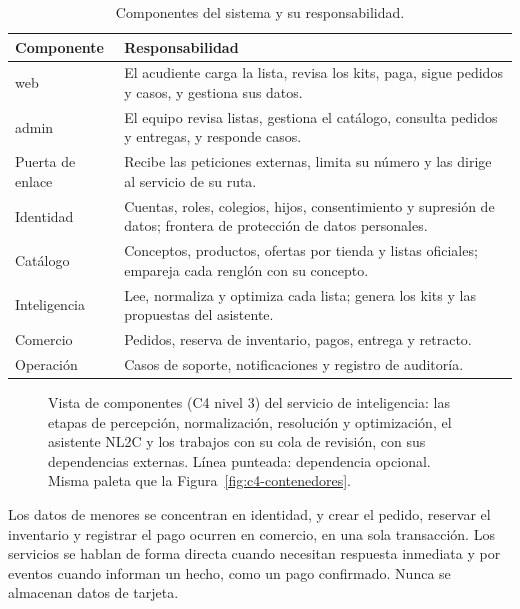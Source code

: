 \begin{table}[!htb]
\centering\footnotesize
\setlength{\tabcolsep}{4pt}
\renewcommand{\arraystretch}{1.15}
\caption{Componentes del sistema y su responsabilidad.}
\label{tab:servicios}
\begin{tabularx}{\textwidth}{@{}p{2.9cm}X@{}}
\toprule
\textbf{Componente} & \textbf{Responsabilidad} \\
\midrule
web & El acudiente carga la lista, revisa los kits, paga, sigue pedidos y casos, y gestiona sus datos. \\
admin & El equipo revisa listas, gestiona el catálogo, consulta pedidos y entregas, y responde casos. \\
Puerta de enlace & Recibe las peticiones externas, limita su número y las dirige al servicio de su ruta. \\
Identidad & Cuentas, roles, colegios, hijos, consentimiento y supresión de datos; frontera de protección de datos personales. \\
Catálogo & Conceptos, productos, ofertas por tienda y listas oficiales; empareja cada renglón con su concepto. \\
Inteligencia & Lee, normaliza y optimiza cada lista; genera los kits y las propuestas del asistente. \\
Comercio & Pedidos, reserva de inventario, pagos, entrega y retracto. \\
Operación & Casos de soporte, notificaciones y registro de auditoría. \\
\bottomrule
\end{tabularx}
\end{table}

\begin{figure}[!htb]
\centering
\resizebox{0.9\textwidth}{!}{}
\caption{Vista de componentes (C4 nivel 3) del servicio de inteligencia: las etapas de percepción,
normalización, resolución y optimización, el asistente NL2C y los trabajos con su cola de revisión,
con sus dependencias externas. Línea punteada: dependencia opcional. Misma paleta que la
Figura~\ref{fig:c4-contenedores}.}
\label{fig:c4-componentes}
\end{figure}

Los datos de menores se concentran en identidad, y crear el pedido, reservar el inventario y registrar el pago ocurren en comercio, en una sola transacción. Los servicios se hablan de forma directa cuando necesitan respuesta inmediata y por eventos cuando informan un hecho, como un pago confirmado. Nunca se almacenan datos de tarjeta.

